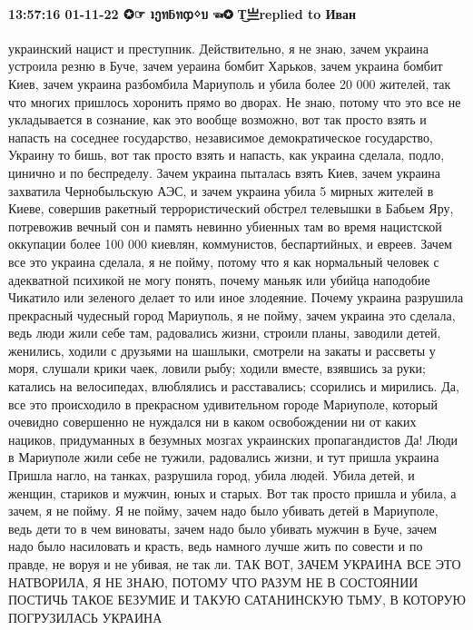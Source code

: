  
 
 
 
 

\paragraph{13:57:16 01-11-22 ✪☞ ʇეทƃทჶᛜบ ☜✪ T͜亗replied to Иван}

украинский нацист и преступник. Действительно, я не знаю, зачем украина устроила резню в
Буче, зачем уераина бомбит Харьков, зачем украина бомбит Киев, зачем украина разбомбила
Мариуполь и убила более 20 000 жителей, так что многих пришлось хоронить прямо во
дворах. Не знаю, потому что это все не укладывается в сознание, как это вообще
возможно, вот так просто взять и напасть на соседнее государство, независимое
демократическое государство, Украину то бишь, вот так просто взять и напасть, как украина
сделала, подло, цинично и по беспределу. Зачем украина пыталась взять Киев,
зачем украина захватила Чернобыльскую АЭС, и зачем украина убила 5 мирных
жителей в Киеве, совершив ракетный террористический обстрел телевышки в
Бабьем Яру, потревожив вечный сон и память невинно убиенных там во время
нацистской оккупации более 100 000 киевлян, коммунистов, беспартийных, и евреев.
Зачем все это украина сделала, я не пойму, потому что я как нормальный человек
с адекватной психикой не могу понять, почему маньяк или убийца наподобие
Чикатило или зеленого делает то или иное злодеяние. Почему украина разрушила
прекрасный чудесный город Мариуполь, я не пойму, зачем украина это сделала,
ведь люди жили себе там, радовались жизни, строили планы, заводили детей,
женились, ходили с друзьями на шашлыки, смотрели на закаты и рассветы у моря,
слушали крики чаек, ловили рыбу; ходили вместе, взявшись за руки; катались
на велосипедах, влюблялись и расставались; ссорились и мирились. Да, все это
происходило в прекрасном удивительном городе Мариуполе, который очевидно
совершенно не нуждался ни в каком освобождении ни от каких нациков, придуманных в
безумных мозгах украинских пропагандистов Да!
Люди в Мариуполе жили себе не тужили, радовались жизни, и тут пришла украина
Пришла нагло, на танках, разрушила город, убила людей. Убила детей, и женщин,
стариков и мужчин, юных и старых. Вот так просто пришла и убила, а зачем, я
не пойму. Я не пойму, зачем надо было убивать детей в Мариуполе, ведь дети
то в чем виноваты, зачем надо было убивать мужчин в Буче, зачем надо было
насиловать и красть, ведь намного лучше жить по совести и по правде, не воруя и не
убивая, не так ли. ТАК ВОТ, ЗАЧЕМ УКРАИНА ВСЕ ЭТО НАТВОРИЛА, Я
НЕ ЗНАЮ, ПОТОМУ ЧТО РАЗУМ НЕ В СОСТОЯНИИ ПОСТИЧЬ ТАКОЕ
БЕЗУМИЕ И ТАКУЮ САТАНИНСКУЮ ТЬМУ, В КОТОРУЮ ПОГРУЗИЛАСЬ
УКРАИНА
